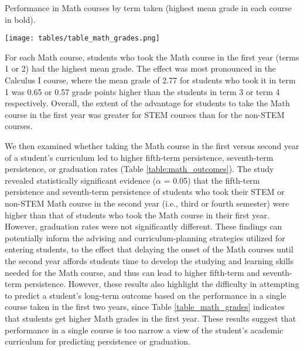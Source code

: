 \documentclass[conference]{IEEEtran}
\begin{document}
\begin{table}[htbp]
\caption{Performance in Math courses by term taken (highest mean grade in each course in bold).}
\texttt{[image: tables/table\_math\_grades.png]}
\label{table_math_grades}
\end{table}

For each Math course, students who took the Math course in the first year (terms 1 or 2) had the highest mean grade.  The effect was most pronounced in the Calculus I course, where the mean grade of 2.77 for students who took it in term 1 was 0.65 or 0.57 grade points higher than the students in term 3 or term 4 respectively. Overall, the extent of the advantage for students to take the Math course in the first year was greater for STEM courses than for the non-STEM courses.

We then examined whether taking the Math course in the first versus second year of a student's curriculum led to higher fifth-term persistence, seventh-term persistence, or graduation rates (Table \ref{table:math_outcomes}).  The study revealed statistically significant evidence ($\alpha$ = 0.05) that the fifth-term persistence and seventh-term persistence of students who took their STEM or non-STEM Math course in the second year (i.e., third or fourth semester) were higher than that of students who took the Math course in their first year.  However, graduation rates were not significantly different.  %
These findings can potentially inform the advising and curriculum-planning strategies utilized for entering students, to the effect that delaying the onset of the Math courses until the second year affords students time to develop the studying and learning skills needed for the Math course, and thus can lead to higher fifth-term and seventh-term persistence.  However, these results also highlight the difficulty in attempting to predict a student's long-term outcome based on the performance in a single course taken in the first two years, since Table \ref{table_math_grades} indicates that students get higher Math grades in the first year.  These results suggest that performance in a single course is too narrow a view of the student's academic curriculum for predicting persistence or graduation.
\end{document}
